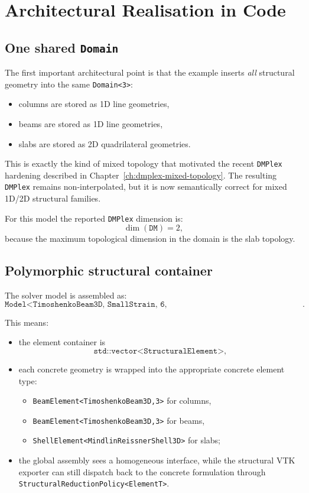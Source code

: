 \section{Architectural Realisation in Code}

\subsection{One shared \texttt{Domain}}

The first important architectural point is that the example inserts
\emph{all} structural geometry into the same \texttt{Domain<3>}:
\begin{itemize}
  \item columns are stored as 1D line geometries,
  \item beams are stored as 1D line geometries,
  \item slabs are stored as 2D quadrilateral geometries.
\end{itemize}

This is exactly the kind of mixed topology that motivated the recent
\texttt{DMPlex} hardening described in Chapter~\ref{ch:dmplex-mixed-topology}.
The resulting \texttt{DMPlex} remains non-interpolated, but it is now
semantically correct for mixed 1D/2D structural families.

For this model the reported \texttt{DMPlex} dimension is:
\[
\dim(\texttt{DM}) = 2,
\]
because the maximum topological dimension in the domain is the slab topology.

\subsection{Polymorphic structural container}

The solver model is assembled as:
\[
\texttt{Model<TimoshenkoBeam3D,\ SmallStrain,\ 6,\ SingleElementPolicy<StructuralElement>>}.
\]

This means:
\begin{itemize}
  \item the element container is
        \[
        \texttt{std::vector<StructuralElement>},
        \]
  \item each concrete geometry is wrapped into the appropriate concrete
        element type:
        \begin{itemize}
          \item \texttt{BeamElement<TimoshenkoBeam3D,3>} for columns,
          \item \texttt{BeamElement<TimoshenkoBeam3D,3>} for beams,
          \item \texttt{ShellElement<MindlinReissnerShell3D>} for slabs;
        \end{itemize}
  \item the global assembly sees a homogeneous interface, while the structural
        VTK exporter can still dispatch back to the concrete formulation
        through \texttt{StructuralReductionPolicy<ElementT>}.
\end{itemize}

